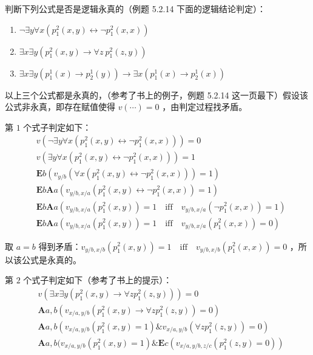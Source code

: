 \documentclass[UTF8]{ctexart}
\begin{document}
    判断下列公式是否是逻辑永真的（例题 5.2.14 下面的逻辑结论判定）：

    \begin{enumerate}
        \item $\lnot \exists y \forall x (p_1^2(x, y) \leftrightarrow \lnot p_1^2(x, x))$
        \item $\exists x \exists y (p_1^2(x, y) \to \forall z\ p_1^2(z, y))$
        \item $\exists x \exists y (p_1^1(x) \to p_2^1(y)) \to \exists x (p_1^1(x) \to p_2^1(x))$
    \end{enumerate}

    以上三个公式都是永真的，（参考了书上的例子，例题 5.2.14 这一页最下）假设该公式非永真，即存在赋值使得 $v(\cdots) = 0$ ，由判定过程找矛盾。

    第 $1$ 个式子判定如下：
    \begin{align*}
        & v(\lnot \exists y \forall x (p_1^2(x, y) \leftrightarrow \lnot p_1^2(x, x))) = 0 \\
        & v(\exists y \forall x (p_1^2(x, y) \leftrightarrow \lnot p_1^2(x, x))) = 1 \\
        & \mathbf{E}b( v_{y/b}(\forall x(p_1^2(x, y) \leftrightarrow \lnot p_1^2(x, x))) = 1 ) \\
        & \mathbf{E}b\mathbf{A}a( v_{y/b,x/a}( p_1^2(x, y) \leftrightarrow \lnot p_1^2(x, x) ) = 1 ) \\
        & \mathbf{E}b\mathbf{A}a( v_{y/b,x/a}( p_1^2(x, y)) = 1\quad \mathrm{iff}\quad  v_{y/b,x/a}( \lnot p_1^2(x, x) ) = 1 ) \\
        & \mathbf{E}b\mathbf{A}a( v_{y/b,x/a}( p_1^2(x, y)) = 1\quad \mathrm{iff}\quad  v_{y/b,x/a}( p_1^2(x, x) ) = 0 )
    \end{align*}
    
    取 $a=b$ 得到矛盾：$v_{y/b,x/b}( p_1^2(x, y)) = 1\quad \mathrm{iff}\quad  v_{y/b,x/b}( p_1^2(x, x) ) = 0$ ，所以该公式是永真的。

    第 $2$ 个式子判定如下（参考了书上的提示）：
    \begin{align*}
        & v(\exists x \exists y ( p_1^2(x, y) \to \forall z p_1^2(z, y))) = 0 \\
        & \mathbf{A}a, b(v_{x/a,y/b}(p_1^2(x, y) \to \forall z p_1^2(z, y)) = 0) \\
        & \mathbf{A}a, b(v_{x/a,y/b}(p_1^2(x, y)=1) \& v_{x/a,y/b}(\forall z p_1^2(z, y)) = 0) \\
        & \mathbf{A}a, b(v_{x/a,y/b}(p_1^2(x, y)=1) \& \mathbf{E}c(v_{x/a,y/b,z/c}(p_1^2(z, y)=0))
    \end{align*}
\end{document}
